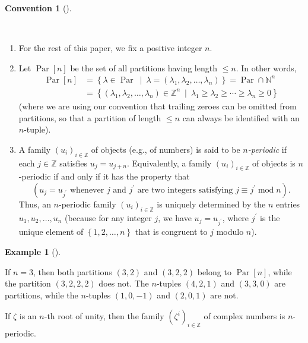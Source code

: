 \documentclass[numbers=enddot,12pt,final,onecolumn,notitlepage]{scrartcl}%
\theoremstyle{definition}
\newtheorem{conv}[theo]{Convention}
\newenvironment{convention}[1][]
{\begin{conv}[#1]\begin{leftbar}}
{\end{leftbar}\end{conv}}
\newtheorem{exam}[theo]{Example}
\newenvironment{example}[1][]
{\begin{exam}[#1]\begin{leftbar}}
{\end{leftbar}\end{exam}}
\begin{document}
\begin{convention}
\label{conv.main}\ \ 

\begin{enumerate}
\item[\textbf{(a)}] For the rest of this paper, we fix a positive integer $n$.

\item[\textbf{(b)}] Let $\operatorname*{Par}\left[  n\right]  $ be the set of
all partitions having length $\leq n$. In other words,%
\begin{align*}
\operatorname*{Par}\left[  n\right]   &  =\left\{  \lambda\in
\operatorname*{Par}\ \mid\ \lambda=\left(  \lambda_{1},\lambda_{2}%
,\ldots,\lambda_{n}\right)  \right\}  =\operatorname*{Par}\cap\mathbb{N}^{n}\\
&  =\left\{  \left(  \lambda_{1},\lambda_{2},\ldots,\lambda_{n}\right)
\in\mathbb{Z}^{n}\ \mid\ \lambda_{1}\geq\lambda_{2}\geq\cdots\geq\lambda
_{n}\geq0\right\}
\end{align*}
(where we are using our convention that trailing zeroes can be omitted from
partitions, so that a partition of length $\leq n$ can always be identified
with an $n$-tuple).

\item[\textbf{(c)}] A family $\left(  u_{i}\right)  _{i\in\mathbb{Z}}$ of
objects (e.g., of numbers) is said to be $n$\emph{-periodic} if each
$j\in\mathbb{Z}$ satisfies $u_{j}=u_{j+n}$. Equivalently, a family $\left(
u_{i}\right)  _{i\in\mathbb{Z}}$ of objects is $n$-periodic if and only if it
has the property that%
\[
\left(  u_{j}=u_{j^{\prime}}\text{ whenever }j\text{ and }j^{\prime}\text{ are
two integers satisfying }j\equiv j^{\prime}\operatorname{mod}n\right)  .
\]
Thus, an $n$-periodic family $\left(  u_{i}\right)  _{i\in\mathbb{Z}}$ is
uniquely determined by the $n$ entries $u_{1},u_{2},\ldots,u_{n}$ (because for
any integer $j$, we have $u_{j}=u_{j^{\prime}}$, where $j^{\prime}$ is the
unique element of $\left\{  1,2,\ldots,n\right\}  $ that is congruent to $j$
modulo $n$).
\end{enumerate}
\end{convention}

\begin{example}
If $n=3$, then both partitions $\left(  3,2\right)  $ and $\left(
3,2,2\right)  $ belong to $\operatorname*{Par}\left[  n\right]  $, while the
partition $\left(  3,2,2,2\right)  $ does not. The $n$-tuples $\left(
4,2,1\right)  $ and $\left(  3,3,0\right)  $ are partitions, while the
$n$-tuples $\left(  1,0,-1\right)  $ and $\left(  2,0,1\right)  $ are not.

If $\zeta$ is an $n$-th root of unity, then the family $\left(  \zeta
^{i}\right)  _{i\in\mathbb{Z}}$ of complex numbers is $n$-periodic.
\end{example}
\end{document}
